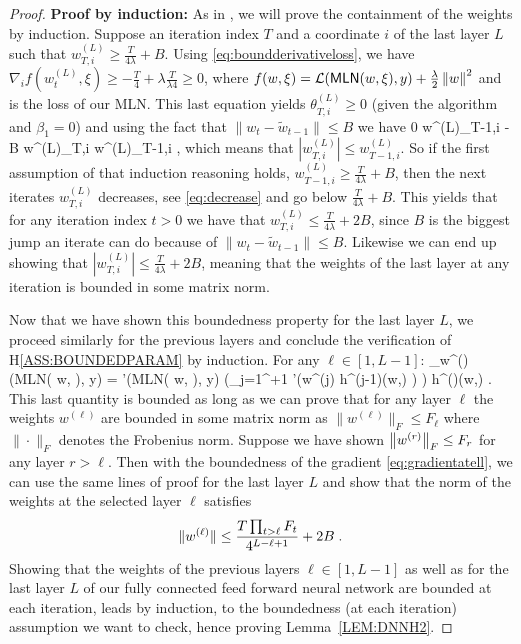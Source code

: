 \documentclass[wcp]{jmlr}
\begin{document}
\begin{proof}
\textbf{Proof by induction:} As in \citep{defossez2020convergence}, we will prove the containment of the weights by induction.
Suppose an iteration index $T$ and a coordinate $i$ of the last layer $L$ such that $w^{(L)}_{T, i} \geq \frac{T}{4\lambda} + B$.
Using \eqref{eq:boundderivativeloss}, we have $
\nabla_i f(w^{(L)}_t, \xi) \geq - \frac{T}{4} + \lambda \frac{T}{\lambda4} \geq 0 $,
where $f(w, \xi) = \mathcal{L}(\textsf{MLN}( w, \xi), y) +\frac{\lambda}{2}\norm{w}^2$ and is the loss of our MLN.
This last equation yields $\theta^{(L)}_{T,i} \geq 0$ (given the algorithm and $\beta_1 = 0$) and using the fact that $\|w_t - \tilde{w}_{t-1}\| \leq B$ we have
\beq\label{eq:decrease}
0 \leq w^{(L)}_{T-1,i} - B \leq w^{(L)}_{T,i} \leq w^{(L)}_{T-1,i} \eqsp,
\eeq
which means that $| w^{(L)}_{T,i}| \leq w^{(L)}_{T-1,i}$.
So if the first assumption of that induction reasoning holds, \ie $w^{(L)}_{T-1, i} \geq \frac{T}{4\lambda} + B$, then the next iterates $w^{(L)}_{T, i}$ decreases, see \eqref{eq:decrease} and go below $\frac{T}{4\lambda} + B$. This yields that for any iteration index $t >0$ we have that $w^{(L)}_{T, i} \leq \frac{T}{4\lambda} + 2B$,
since $B$ is the biggest jump an iterate can do because of $\|w_t - \tilde{w}_{t-1}\| \leq B$.
Likewise we can end up showing that $|w^{(L)}_{T, i}| \leq \frac{T}{4\lambda} + 2B$, meaning that the weights of the last layer at any iteration is bounded in some matrix norm.

Now that we have shown this boundedness property for the last layer $L$, we proceed similarly for the previous layers and conclude the verification of H\ref{ASS:BOUNDEDPARAM} by induction.
For any $\ell \in [1, L-1]$:
\beq\label{eq:gradientatell}
\nabla_{w^{(\ell)}}  (\textsf{MLN}( w, \xi), y)  =  '(\textsf{MLN}( w, \xi), y) \left(\prod_{j=1}^{\ell+1} \sigma'\left(w^{(j)} h^{(j-1)}(w,\xi) \right) \right) h^{()}(w,\xi)  \eqsp.
\eeq
This last quantity is bounded as long as we can prove that for any layer $\ell$ the weights $w^{(\ell)}$ are bounded in some matrix norm as $\|w^{(\ell)}\|_{F} \leq F_\ell$ where $\|\cdot\|_{F}$ denotes the Frobenius norm.
Suppose we have shown $\norm{w^{(r)}}_{F} \leq F_r$ for any layer $r > \ell$. 
Then with the boundedness of the gradient \eqref{eq:gradientatell}, we can use the same lines of proof for the last layer $L$ and show that the norm of the weights at the selected layer $\ell$ satisfies
$$
\|w^{(\ell)}\| \leq \frac{T \prod_{t > \ell} F_t}{4^{L-\ell+1}} + 2B\eqsp.
$$
Showing that the weights of the previous layers $\ell \in [1, L-1]$ as well as for the last layer $L$ of our fully connected feed forward neural network are bounded at each iteration, leads by induction, to the boundedness (at each iteration) assumption we want to check, hence proving Lemma~\ref{LEM:DNNH2}.
\end{proof}
\end{document}
